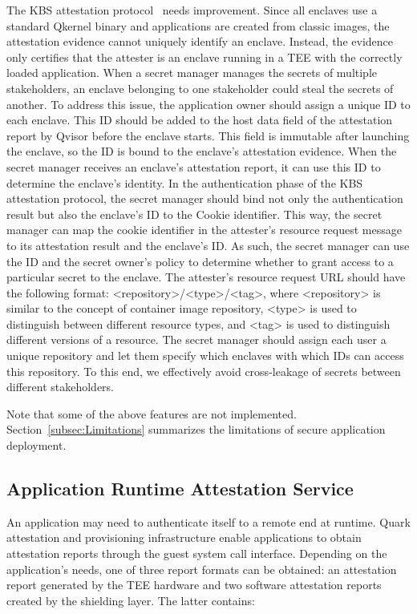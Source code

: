 \label{eq:1}The KBS attestation protocol~\cite*{kbs_Attestation_protocol} needs improvement. Since all enclaves use a standard Qkernel binary and applications are created from classic images, the attestation evidence cannot uniquely identify an enclave. Instead, the evidence only certifies that the attester is an enclave running in a TEE with the correctly loaded application. 
When a secret manager manages the secrets of multiple stakeholders, an enclave belonging to one stakeholder could steal the secrets of another. To address this issue, the application owner should assign a unique ID to each enclave. This ID should be added to the host data field of the attestation report by Qvisor before the enclave starts. This field is immutable after 
launching the enclave, so the ID is bound to the enclave's attestation evidence. When the secret manager receives an enclave's attestation report, it can use this ID to determine the enclave's identity. In the authentication phase of the KBS attestation protocol, the secret manager should bind not only the authentication result but also the enclave's ID to the Cookie identifier. 
This way, the secret manager can map the cookie identifier in the attester's resource request message to its attestation result and the enclave's ID. As such, the secret manager can use the ID and the secret owner's policy to determine whether to grant access to a particular secret to the enclave. The attester's resource request URL should have the following 
format: <repository>/<type>/<tag>, where <repository> is similar to the concept of container image repository, <type> is used to distinguish between different resource types, and <tag> is used to distinguish different versions of a resource. The secret manager should assign each user a unique repository and let them specify which enclaves with which IDs can access 
this repository. To this end, we effectively avoid cross-leakage of secrets between different stakeholders.

Note that some of the above features are not implemented. Section~\ref{subsec:Limitations} summarizes the limitations of secure application deployment.

\subsection{Application Runtime Attestation Service}
\label{sec:runtime_attesation}

An application may need to authenticate itself to a  remote end at runtime. Quark attestation and provisioning infrastructure enable applications to obtain attestation reports through the guest system call interface. Depending on the application's needs, one of three report formats can be 
obtained: an attestation report generated by the TEE hardware and two software attestation reports created by the shielding layer. The latter contains:

